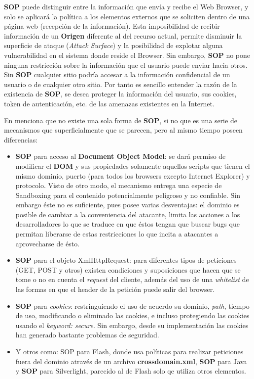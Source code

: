     \textbf{SOP} puede distinguir entre la información que envía y recibe el Web Browser, y solo se aplicará la política a los elementos externos que se soliciten dentro de una página web (recepción de la información). Esta imposibilidad de recibir información de un \textbf{Origen} diferente al del recurso actual, permite disminuir la superficie de ataque (\textit{Attack Surface}) y la posibilidad de explotar alguna vulnerabilidad en el sistema donde reside el Browser. Sin embargo, \textbf{SOP} no pone ninguna restricción sobre la información que el usuario puede enviar hacia otros. Sin \textbf{SOP} cualquier sitio podría accesar a la información confidencial de un usuario o de cualquier otro sitio. Por tanto es sencillo entender la razón de la existencia de \textbf{SOP}, se desea proteger la información del usuario, sus cookies, token de autenticación, etc. de las amenazas existentes en la Internet.


    En \cite{Zalewsk08} menciona que no existe una sola forma de \textbf{SOP}, si no que es una serie de mecanismos que superficialmente que se parecen, pero al mismo tiempo poseen diferencias:

    \begin{itemize}
        \item \textbf{SOP} para acceso al \textbf{Document Object Model}: se dará permiso de modificar el \textbf{DOM} y sus propiedades solamente aquellos scripts que tienen el mismo dominio, puerto (para todos los browsers excepto Internet Explorer) y protocolo. Visto de otro modo, el mecanismo entrega una especie de Sandboxing para el contenido potencialmente peligroso y no confiable. Sin embargo éste no es suficiente, pues posee varias desventajas: el dominio es posible de cambiar a la conveniencia del atacante, limita las acciones a los desarrolladores lo que se traduce en que éstos tengan que buscar bugs que permitan liberarse de estas restricciones lo que incita a atacantes a aprovecharse de ésto.
        \item \textbf{SOP} para el objeto XmlHttpRequest: para diferentes tipos de peticiones (GET, POST y otros) existen condiciones y suposiciones que hacen que se tome o no en cuenta el \textit{request} del cliente, además del uso de una \textit{whitelist} de las formas en que el header de la petición puede salir del browser.
        \item \textbf{SOP} para \textit{cookies}: restringuiendo el uso de acuerdo su dominio, \textit{path}, tiempo de uso, modificando o eliminado las cookies, e incluso protegiendo las cookies usando el \textit{keyword: secure}. Sin embargo, desde su implementación las cookies han generado bastante problemas de seguridad.
        \item Y otros como: {SOP} para Flash, donde usa políticas para realizar peticiones fuera del dominio através de un archivo \textbf{crossdomain.xml}, \textbf{SOP} para Java y \textbf{SOP} para Silverlight, parecido al de Flash solo qe utiliza otros elementos.
    \end{itemize}

